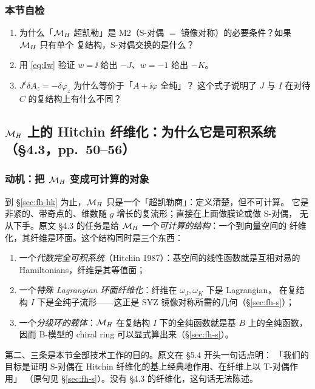 \subsubsection*{本节自检}
\begin{enumerate}
\item 为什么「$\mathcal{M}_H$ 超凯勒」是 M2（S-对偶 $=$ 镜像对称）的必要条件？如果 $\mathcal{M}_H$ 只有单个
复结构，S-对偶交换的是什么？
\item 用 \eqref{eq:Iw} 验证 $w=\ii$ 给出 $-J$、$w=-1$ 给出 $-K$。
\item $J^t\delta A_z=-\delta\varphi_{\bar z}$ 为什么等价于「$A+\ii\varphi$ 全纯」？
这个式子说明了 $J$ 与 $I$ 在对待 $C$ 的复结构上有什么不同？
\end{enumerate}

\subsection{$\mathcal{M}_H$ 上的 Hitchin 纤维化：为什么它是可积系统（§4.3，pp.~50--56）}
\label{sec:fh-fib}

\subsubsection*{动机：把 $\mathcal{M}_H$ 变成可计算的对象}

到 §\ref{sec:fh-hk} 为止，$\mathcal{M}_H$ 只是一个「超凯勒商」：定义清楚，但不可计算。
它是非紧的、带奇点的、维数随 $g$ 增长的复流形；直接在上面做膜论或做 S-对偶，
无从下手。原文 §4.3 的任务是给 $\mathcal{M}_H$ 一个\emph{可计算的结构}：一个到向量空间的
纤维化，其纤维是环面。这个结构同时是三个东西：
\begin{enumerate}
\item 一个\emph{代数完全可积系统}（Hitchin 1987）：基空间的线性函数就是互相对易的
  Hamiltonians，纤维是其等值面；
\item 一个\emph{特殊 Lagrangian 环面纤维化}：纤维在 $\omega_J,\omega_K$ 下是 Lagrangian，
  在复结构 $I$ 下是全纯子流形——这正是 SYZ 镜像对称所需的几何（§\ref{sec:fh-s}）；
\item 一个\emph{分级环的载体}：$\mathcal{M}_H$ 在复结构 $I$ 下的全纯函数就是基 $B$ 上的全纯函数，
  因而 B-模型的 chiral ring 可以显式算出来（§\ref{sec:fh-s}）。
\end{enumerate}
第二、三条是本节全部技术工作的目的。原文在 §5.4 开头一句话点明：
「我们的目标是证明 S-对偶在 Hitchin 纤维化的基上经典地作用、在纤维上以 T-对偶作用」
（原句见 §\ref{sec:fh-s}）。没有 §4.3 的纤维化，这句话无法陈述。

